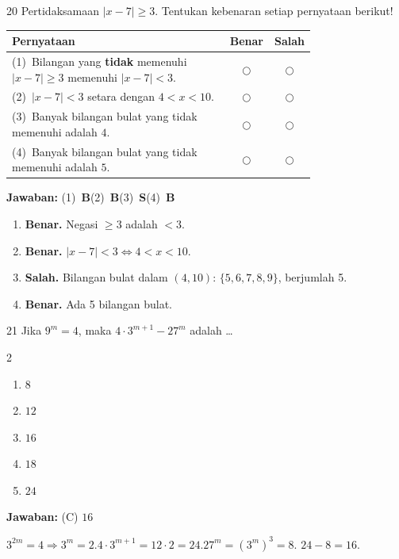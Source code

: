 \documentclass[11pt]{article}
\newcommand{\jawaban}[1]{%
  \noindent\colorbox{gold!30}{\parbox{\dimexpr\linewidth-2\fboxsep\relax}{%
    \textbf{Jawaban:} #1}}\par\smallskip}
\newenvironment{pilB}{%
  \par\smallskip\begin{multicols}{2}
  \begin{enumerate}[label=(\Alph*),leftmargin=*,itemsep=1pt,topsep=3pt]}%
  {\end{enumerate}\end{multicols}}
\begin{document}
\begin{soal}{20}
Pertidaksamaan $|x-7|\geq3$.
Tentukan kebenaran setiap pernyataan berikut!

\par\smallskip
{\renewcommand{\arraystretch}{1.4}%
\begin{tabular}{@{}p{0.76\linewidth}cc@{}}
\hline\textbf{Pernyataan}&\textbf{Benar}&\textbf{Salah}\\\hline
(1)~Bilangan yang \textbf{tidak} memenuhi $|x-7|\geq3$ memenuhi $|x-7|<3$.&$\bigcirc$&$\bigcirc$\\
(2)~$|x-7|<3$ setara dengan $4<x<10$.&$\bigcirc$&$\bigcirc$\\
(3)~Banyak bilangan bulat yang tidak memenuhi adalah $4$.&$\bigcirc$&$\bigcirc$\\
(4)~Banyak bilangan bulat yang tidak memenuhi adalah $5$.&$\bigcirc$&$\bigcirc$\\\hline
\end{tabular}}
\end{soal}
\begin{pembox}
\jawaban{(1)~\textbf{B}\quad(2)~\textbf{B}\quad(3)~\textbf{S}\quad(4)~\textbf{B}}
\begin{enumerate}[leftmargin=*,topsep=2pt,itemsep=2pt]
\item \textbf{Benar.} Negasi $\geq3$ adalah $<3$.
\item \textbf{Benar.} $|x-7|<3\Leftrightarrow4<x<10$.
\item \textbf{Salah.} Bilangan bulat dalam $(4,10)$: $\{5,6,7,8,9\}$, berjumlah 5.
\item \textbf{Benar.} Ada 5 bilangan bulat.
\end{enumerate}
\end{pembox}


\begin{soal}{21}
Jika $9^m=4$, maka $4\cdot3^{m+1}-27^m$ adalah \ldots
\begin{pilB}\item $8$\item $12$\item $16$\item $18$\item $24$\end{pilB}
\end{soal}
\begin{pembox}
\jawaban{(C) $16$}
$3^{2m}=4\Rightarrow3^m=2$.\quad$4\cdot3^{m+1}=12\cdot2=24$.\quad$27^m=(3^m)^3=8$.
$24-8=16$.
\end{pembox}
\end{document}
